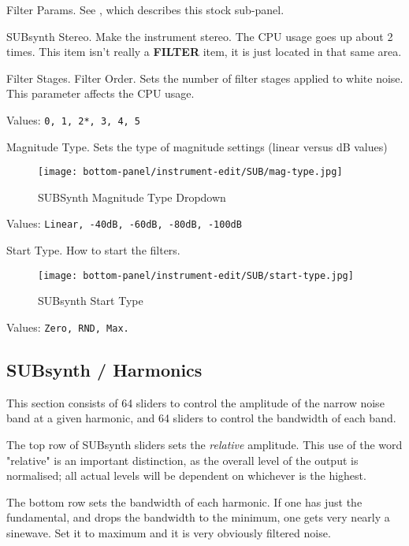    Filter Params.  See
   ,
   which describes this stock sub-panel.

   SUBsynth Stereo.
   Make the instrument stereo. The CPU usage goes up about 2 times.
   This item isn't really a \textbf{FILTER} item, it is just located in that
   same area.

   Filter Stages.  Filter Order.
   Sets the number of filter stages applied to white noise. This parameter
   affects the CPU usage.

   Values: \texttt{0, 1, 2*, 3, 4, 5}

   Magnitude Type.
   Sets the type of magnitude settings (linear versus dB values)

\begin{figure}[H]
   \centering
   \texttt{[image: bottom-panel/instrument-edit/SUB/mag-type.jpg]}
   \caption{SUBSynth Magnitude Type Dropdown}
   \label{fig:subsynth_magnitude_type_dropdown}
\end{figure}

   Values: \texttt{Linear, -40dB, -60dB, -80dB, -100dB}

   Start Type.
   How to start the filters.

\begin{figure}[H]
   \centering
   \texttt{[image: bottom-panel/instrument-edit/SUB/start-type.jpg]}
   \caption{SUBsynth Start Type}
   \label{fig:subsynth_start_type}
\end{figure}

   Values: \texttt{Zero, RND, Max.}

\subsection{SUBsynth / Harmonics}
\label{subsec:subsynth_harmonics}

   This section consists of 64 sliders to control the amplitude of the narrow
   noise band at a given harmonic, and 64 sliders to control the bandwidth of
   each band.

   The top row of SUBsynth sliders sets the \textsl{relative} amplitude.  This
   use of the word "relative" is an important distinction, as the overall level
   of the output is normalised; all actual levels will be dependent on whichever
   is the highest.

   The bottom row sets the bandwidth of each harmonic. If one has just the
   fundamental, and drops the bandwidth to the minimum, one gets very nearly a
   sinewave.  Set it to maximum and it is very obviously filtered noise.


